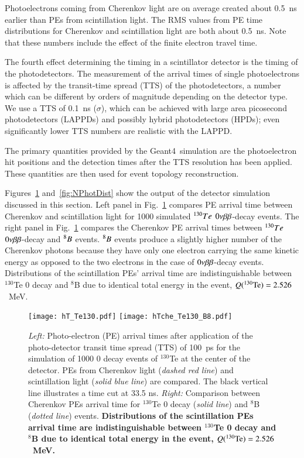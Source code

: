 Photoelectrons coming from Cherenkov light are on average
created about 0.5~ns earlier than PEs from scintillation light. The
RMS values from PE time distributions for Cherenkov and scintillation
light are both about 0.5~ns. Note that these numbers include the
effect of the finite electron travel time.

The fourth effect determining the timing in a scintillator detector is the timing of the photodetectors. The measurement of the arrival times of single photoelectrons is
affected by the transit-time spread (TTS) of the photodetectors, a
number which can be different by orders of magnitude depending on the
detector type. We use a TTS of 0.1~ns ($\sigma$), which can be achieved with large area picosecond photodetectors
(LAPPDs)\cite{Adams:2013nva,RSI_paper,PSEC4_paper,anode_paper} and possibly hybrid photodetectors
(HPDs)\cite{hpdThesis}; even significantly lower TTS numbers are
realistic with the LAPPD\cite{RSI_paper,PSEC4_paper,anode_paper}.

The primary quantities provided by the Geant4~simulation are the photoelectron hit
positions and the detection times after the TTS resolution has been
applied. These quantities are then used for event topology reconstruction.

Figures~\ref{fig:ArrivalTimeDist} and~\ref{fig:NPhotDist} show the output of the detector simulation discussed in this section. Left panel in Fig.~\ref{fig:ArrivalTimeDist} compares PE arrival time between Cherenkov and scintillation light for 1000 simulated $^{130}Te$ $0\nu\beta\beta$-decay events. The right panel in Fig.~\ref{fig:ArrivalTimeDist} compares the Cherenkov PE arrival times between $^{130}Te$ $0\nu\beta\beta$-decay and $^{8}B$ events. $^{8}B$ events produce a slightly higher number of the Cherenkov photons because they have only one electron carrying the same kinetic energy as opposed to the two electrons in the case of $0\nu\beta\beta$-decay events. Distributions of the scintillation PEs' arrival time are indistinguishable between $^{130}$Te 0{\nbb} decay and $^8$B due to identical total energy in the event, $Q(^{130}{\rm Te})=2.526$~MeV.

\begin{figure*}[ht]
  \centering
  \texttt{[image: hT\_Te130.pdf]}
  \texttt{[image: hTche\_Te130\_B8.pdf]}
  \caption{\emph{Left:} Photo-electron (PE) arrival times after
    application of the photo-detector transit time spread (TTS) of
    100~ps for the simulation of 1000 0{\nbb} decay events of
    $^{130}$Te at the center of the detector. PEs from Cherenkov light
    (\emph{dashed red line}) and scintillation light (\emph{solid blue
      line}) are compared. The black vertical line illustrates a time
    cut at 33.5 ns. \emph{Right:} Comparison between Cherenkov PEs
    arrival time for $^{130}$Te {0\nbb} decay (\emph{solid line}) and
    $^{8}$B (\emph{dotted line}) events. {\bf Distributions of the
      scintillation PEs arrival time are indistinguishable between
      $^{130}$Te 0{\nbb} decay and $^8$B due to identical total energy
      in the event, $Q(^{130}{\rm Te})=2.526$~MeV.} }
\label{fig:ArrivalTimeDist}
\end{figure*}

